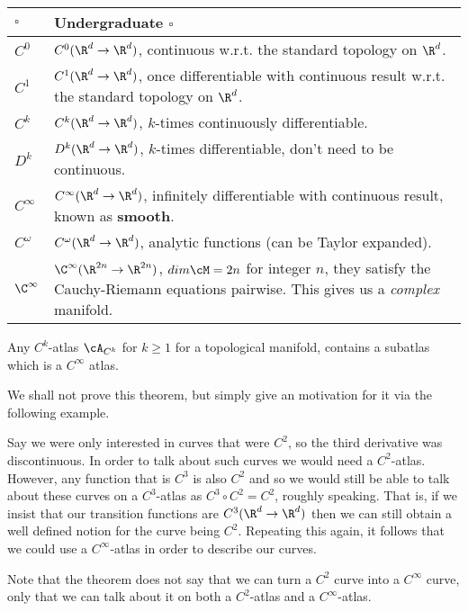 \begin{center}
	\begin{tabular}{@{} p{2cm}p{10cm}@{}}
		\toprule
		$\square$ & Undergraduate $\square$ \\
		\midrule 
		$C^0$ & $C^0(\R^d\to\R^d)$, continuous w.r.t. the standard topology on $\R^d$. \\
		$C^1$ & $C^1(\R^d\to\R^d)$, once differentiable with continuous result w.r.t. the standard topology on $\R^d$. \\
		$C^k$ & $C^k(\R^d\to\R^d)$, $k$-times continuously differentiable. \\
		$D^k$ & $D^k(\R^d\to\R^d)$, $k$-times  differentiable, don't need to be continuous. \\
		$C^{\infty}$ & $C^{\infty}(\R^d\to\R^d)$, infinitely differentiable with continuous result, known as \textbf{smooth}. \\
		$C^{\omega}$ & $C^{\omega}(\R^d\to\R^d)$, analytic functions (can be Taylor expanded). \\
		$\C^{\infty}$ & $\C^{\infty}(\R^{2n}\to\R^{2n})$, $dim \cM = 2n$ for integer $n$, they satisfy the Cauchy-Riemann equations pairwise. This gives us a \textit{complex} manifold. \\
		\bottomrule
	\end{tabular}
\end{center}

    Any $C^k$-atlas $\cA_{C^k}$ for $k\geq 1$ for a topological manifold, contains a subatlas which is a $C^{\infty}$ atlas. 
\et 

We shall not prove this theorem, but simply give an motivation for it via the following example. 

\bex 
    Say we were only interested in curves that were $C^2$, so the third derivative was discontinuous. In order to talk about such curves we would need a $C^2$-atlas. However, any function that is $C^3$ is also $C^2$ and so we would still be able to talk about these curves on a $C^3$-atlas as $C^3\circ C^2 = C^2$, roughly speaking. That is, if we insist that our transition functions are $C^3(\R^d\to\R^d)$ then we can still obtain a well defined notion for the curve being $C^2$. Repeating this again, it follows that we could use a $C^{\infty}$-atlas in order to describe our curves. 
    
    Note that the theorem does not say that we can turn a $C^2$ curve into a $C^{\infty}$ curve, only that we can talk about it on both a $C^2$-atlas and a $C^{\infty}$-atlas. 
\eex 

